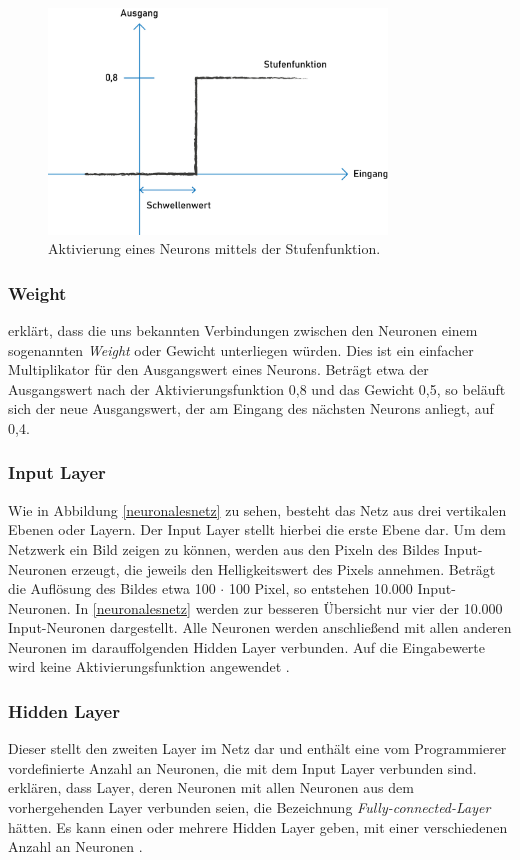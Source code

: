 \begin{figure}[ht]
    \centering
    \includegraphics[width=9cm]{bilder/Stufenfunktion.jpg}
    \caption{Aktivierung eines Neurons mittels der Stufenfunktion.}
    \label{stufenfunktion}
\end{figure}

\subsubsection*{Weight} \citet[37]{traiq_neuron} erklärt, dass die uns bekannten Verbindungen zwischen den Neuronen einem sogenannten \textit{Weight} oder Gewicht unterliegen würden. Dies ist ein einfacher Multiplikator für den Ausgangswert eines Neurons. Beträgt etwa der Ausgangswert nach der Aktivierungsfunktion 0,8 und das Gewicht 0,5, so beläuft sich der neue Ausgangswert, der am Eingang des nächsten Neurons anliegt, auf 0,4.

\subsubsection*{Input Layer} Wie in Abbildung \ref{neuronalesnetz} zu sehen, besteht das Netz aus drei vertikalen Ebenen oder Layern. Der Input Layer stellt hierbei die erste Ebene dar. Um dem Netzwerk ein Bild zeigen zu können, werden aus den Pixeln des Bildes Input-Neuronen erzeugt, die jeweils den Helligkeitswert des Pixels annehmen. Beträgt die Auflösung des Bildes etwa 100 $\cdot$ 100 Pixel, so entstehen 10.000 Input-Neuronen. In \ref{neuronalesnetz} werden zur besseren Übersicht nur vier der 10.000 Input-Neuronen dargestellt. Alle Neuronen werden anschließend mit allen anderen Neuronen im darauffolgenden Hidden Layer verbunden. Auf die Eingabewerte wird keine Aktivierungsfunktion angewendet \parencite[S. 41]{traiq_neuron}.

\subsubsection*{Hidden Layer} Dieser stellt den zweiten Layer im Netz dar und enthält eine vom Programmierer vordefinierte Anzahl an Neuronen, die mit dem Input Layer verbunden sind. \citet[]{ramsundar-no-date} erklären, dass Layer, deren Neuronen mit allen Neuronen aus dem vorhergehenden Layer verbunden seien, die Bezeichnung \textit{Fully-connected-Layer} hätten. Es kann einen oder mehrere Hidden Layer geben, mit einer verschiedenen Anzahl an Neuronen \parencite[S. 52]{traiq_neuron}.

